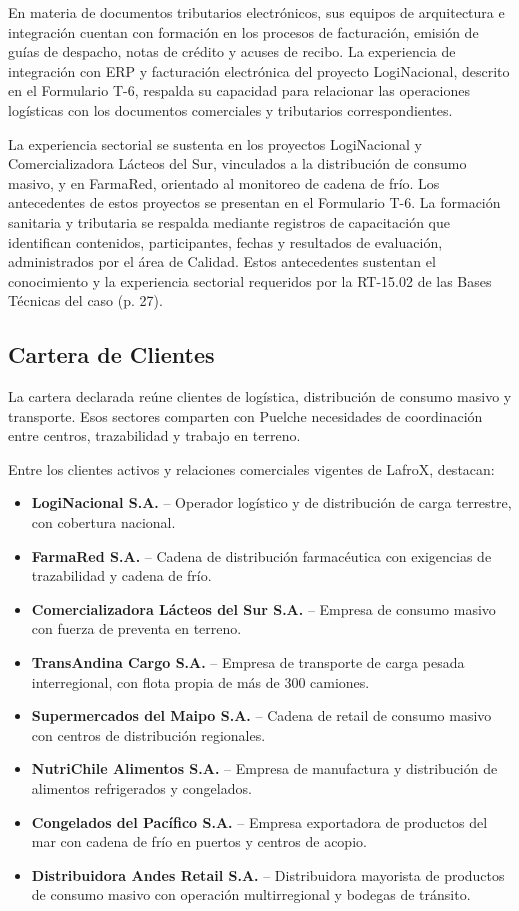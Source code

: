 En materia de documentos tributarios electrónicos, sus equipos de arquitectura e integración cuentan con formación en los procesos de facturación, emisión de guías de despacho, notas de crédito y acuses de recibo. La experiencia de integración con ERP y facturación electrónica del proyecto LogiNacional, descrito en el Formulario T-6, respalda su capacidad para relacionar las operaciones logísticas con los documentos comerciales y tributarios correspondientes.

La experiencia sectorial se sustenta en los proyectos LogiNacional y Comercializadora Lácteos del Sur, vinculados a la distribución de consumo masivo, y en FarmaRed, orientado al monitoreo de cadena de frío. Los antecedentes de estos proyectos se presentan en el Formulario T-6. La formación sanitaria y tributaria se respalda mediante registros de capacitación que identifican contenidos, participantes, fechas y resultados de evaluación, administrados por el área de Calidad. Estos antecedentes sustentan el conocimiento y la experiencia sectorial requeridos por la RT-15.02 de las Bases Técnicas del caso (p. 27).

\subsection{Cartera de Clientes}

La cartera declarada reúne clientes de logística, distribución de consumo masivo y transporte. Esos sectores comparten con Puelche necesidades de coordinación entre centros, trazabilidad y trabajo en terreno.

Entre los clientes activos y relaciones comerciales vigentes de LafroX, destacan:

\begin{itemize}
    \item \textbf{LogiNacional S.A.} -- Operador logístico y de distribución de carga terrestre, con cobertura nacional.
    \item \textbf{FarmaRed S.A.} -- Cadena de distribución farmacéutica con exigencias de trazabilidad y cadena de frío.
    \item \textbf{Comercializadora Lácteos del Sur S.A.} -- Empresa de consumo masivo con fuerza de preventa en terreno.
    \item \textbf{TransAndina Cargo S.A.} -- Empresa de transporte de carga pesada interregional, con flota propia de más de 300 camiones.
    \item \textbf{Supermercados del Maipo S.A.} -- Cadena de retail de consumo masivo con centros de distribución regionales.
    \item \textbf{NutriChile Alimentos S.A.} -- Empresa de manufactura y distribución de alimentos refrigerados y congelados.
    \item \textbf{Congelados del Pacífico S.A.} -- Empresa exportadora de productos del mar con cadena de frío en puertos y centros de acopio.
    \item \textbf{Distribuidora Andes Retail S.A.} -- Distribuidora mayorista de productos de consumo masivo con operación multirregional y bodegas de tránsito.
\end{itemize}

